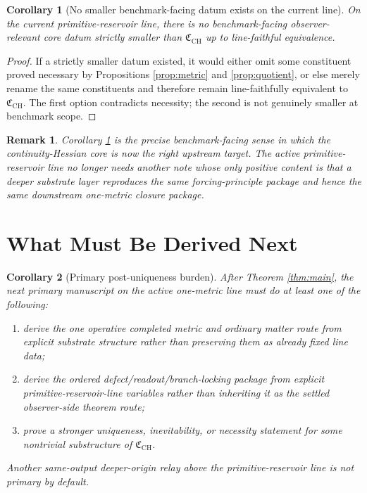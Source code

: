 \documentclass[11pt]{article}
\newcommand{\CoreData}{\mathfrak C_{\mathrm{CH}}}
\newtheorem{remark}{Remark}
\newtheorem{corollary}{Corollary}
\begin{document}
\begin{corollary}[No smaller benchmark-facing datum exists on the current line]
\label{cor:minimal}
On the current primitive-reservoir line, there is no benchmark-facing observer-relevant core datum strictly smaller than \(\CoreData\) up to line-faithful equivalence.
\end{corollary}

\begin{proof}
If a strictly smaller datum existed, it would either omit some constituent proved necessary by Propositions \ref{prop:metric} and \ref{prop:quotient}, or else merely rename the same constituents and therefore remain line-faithfully equivalent to \(\CoreData\). The first option contradicts necessity; the second is not genuinely smaller at benchmark scope.
\end{proof}

\begin{remark}
Corollary \ref{cor:minimal} is the precise benchmark-facing sense in which the continuity-Hessian core is now the right upstream target. The active primitive-reservoir line no longer needs another note whose only positive content is that a deeper substrate layer reproduces the same forcing-principle package and hence the same downstream one-metric closure package.
\end{remark}

\section{What Must Be Derived Next}

\begin{corollary}[Primary post-uniqueness burden]
\label{cor:next}
After Theorem \ref{thm:main}, the next primary manuscript on the active one-metric line must do at least one of the following:
\begin{enumerate}
    \item derive the one operative completed metric and ordinary matter route from explicit substrate structure rather than preserving them as already fixed line data;
    \item derive the ordered defect/readout/branch-locking package from explicit primitive-reservoir-line variables rather than inheriting it as the settled observer-side theorem route;
    \item prove a stronger uniqueness, inevitability, or necessity statement for some nontrivial substructure of \(\CoreData\).
\end{enumerate}
Another same-output deeper-origin relay above the primitive-reservoir line is not primary by default.
\end{corollary}
\end{document}
